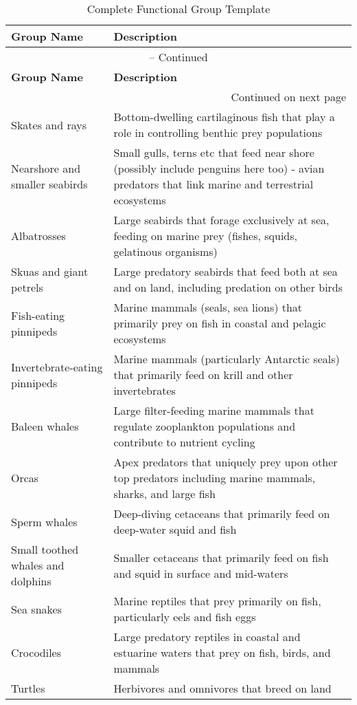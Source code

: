 \begin{longtable}{p{}p{}}
\caption{Complete Functional Group Template} \\
\hline
\textbf{Group Name} & \textbf{Description} \\
\hline
\endfirsthead
\multicolumn{2}{c}{{\tablename} \thetable{} -- Continued} \\
\hline
\textbf{Group Name} & \textbf{Description} \\
\hline
\endhead
\hline
\multicolumn{2}{r}{{Continued on next page}} \\
\endfoot
\hline
\endlastfoot
Skates and rays & Bottom-dwelling cartilaginous fish that play a role in controlling benthic prey populations \\
Nearshore and smaller seabirds & Small gulls, terns etc that feed near shore (possibly include penguins here too) - avian predators that link marine and terrestrial ecosystems \\
Albatrosses & Large seabirds that forage exclusively at sea, feeding on marine prey (fishes, squids, gelatinous organisms) \\
Skuas and giant petrels & Large predatory seabirds that feed both at sea and on land, including predation on other birds \\
Fish-eating pinnipeds & Marine mammals (seals, sea lions) that primarily prey on fish in coastal and pelagic ecosystems \\
Invertebrate-eating pinnipeds & Marine mammals (particularly Antarctic seals) that primarily feed on krill and other invertebrates \\
Baleen whales & Large filter-feeding marine mammals that regulate zooplankton populations and contribute to nutrient cycling \\
Orcas & Apex predators that uniquely prey upon other top predators including marine mammals, sharks, and large fish \\
Sperm whales & Deep-diving cetaceans that primarily feed on deep-water squid and fish \\
Small toothed whales and dolphins & Smaller cetaceans that primarily feed on fish and squid in surface and mid-waters \\
Sea snakes & Marine reptiles that prey primarily on fish, particularly eels and fish eggs \\
Crocodiles & Large predatory reptiles in coastal and estuarine waters that prey on fish, birds, and mammals \\
Turtles & Herbivores and omnivores that breed on land \\

\end{longtable}
